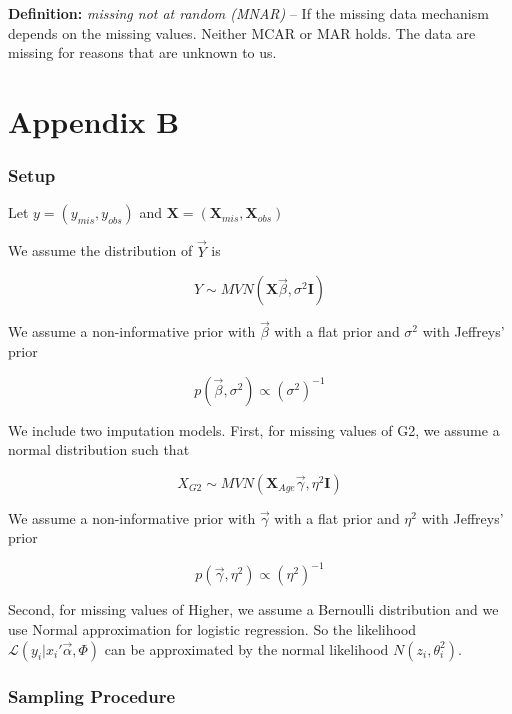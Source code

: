 \documentclass[11pt]{article}
\begin{document}
\vspace{0.25in}

\textbf{Definition:} \textit{missing not at random (MNAR)} -- If the missing data mechanism depends on the missing values. Neither MCAR or MAR holds. The data are missing for reasons that are unknown to us. 

\vspace{0.5in}

\newpage
\section{Appendix B}

\subsubsection{Setup}

Let $y = (y_{mis}, y_{obs})$ and $\mathbf{X} = (\mathbf{X}_{mis}, \mathbf{X}_{obs})$

We assume the distribution of $\vec{Y}$ is

$$Y \sim MVN(\mathbf{X}\vec{\beta}, \sigma^2\mathbf{I})$$

We assume a non-informative prior with $\vec{\beta}$ with a flat prior and $\sigma^2$ with Jeffreys' prior

$$p(\vec{\beta}, \sigma^2) \propto (\sigma^2)^{-1}$$

\vspace{0.25in}

We include two imputation models. First, for missing values of G2, we assume a normal distribution such that

$$X_{G2} \sim MVN(\mathbf{X}_{Age}\vec{\gamma}, \eta^2\mathbf{I})$$

We assume a non-informative prior with $\vec{\gamma}$ with a flat prior and $\eta^2$ with Jeffreys' prior

$$p(\vec{\gamma}, \eta^2) \propto (\eta^2)^{-1}$$

\vspace{0.25in}

Second, for missing values of Higher, we assume a Bernoulli distribution and we use Normal approximation for logistic regression. So the likelihood $\mathcal{L}(y_i|x_i'\vec\alpha, \Phi)$ can be approximated by the normal likelihood $N(z_i, \theta^2_i)$.

\subsubsection{Sampling Procedure}
\end{document}
